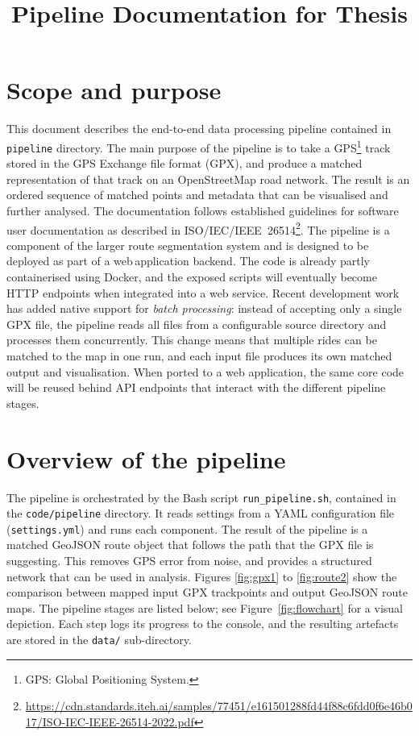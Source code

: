 \documentclass[11pt,a4paper]{article}
\title{Pipeline Documentation for Thesis}
\begin{document}
\maketitle

\section*{Scope and purpose}
This document describes the end-to-end data processing pipeline contained in \texttt{pipeline} directory.  The main purpose of the pipeline is to take a GPS\footnote{GPS: Global Positioning System.} track stored in the GPS Exchange file format (GPX), and produce a matched representation of that track on an OpenStreetMap road network.  The result is an ordered sequence of matched points and metadata that can be visualised and further analysed.  The documentation follows established guidelines for software user documentation as described in ISO/IEC/IEEE~26514\footnote{\url{https://cdn.standards.iteh.ai/samples/77451/e161501288fd44f88c6fdd0f6e46b017/ISO-IEC-IEEE-26514-2022.pdf}}. The pipeline is a component of the larger route segmentation system and is designed to be deployed as part of a web\,application backend. The code is already partly containerised using Docker, and the exposed scripts will eventually become HTTP endpoints when integrated into a web service. Recent development work has added native support for \emph{batch processing}: instead of accepting only a single GPX file, the pipeline reads all files from a configurable source directory and processes them concurrently.  This change means that multiple rides can be matched to the map in one run, and each input file produces its own matched output and visualisation. When ported to a web application, the same core code will be reused behind API endpoints that interact with the different pipeline stages. \citep{gpx-format}

\section{Overview of the pipeline}
The pipeline is orchestrated by the Bash script \texttt{run\_pipeline.sh}, contained in the \texttt{code/pipeline} directory. It reads settings from a YAML configuration file (\texttt{settings.yml}) and runs each component. The result of the pipeline is a matched GeoJSON route object that follows the path that the GPX file is suggesting. This removes GPS error from noise, and provides a structured network that can be used in analysis\citep{Saki2022}. Figures \ref{fig:gpx1} to \ref{fig:route2} show the comparison between mapped input GPX trackpoints and output GeoJSON route maps. The pipeline stages are listed below; see Figure~\ref{fig:flowchart} for a visual depiction.  Each step logs its progress to the console, and the resulting artefacts are stored in the \texttt{data/} sub-directory.
\end{document}

